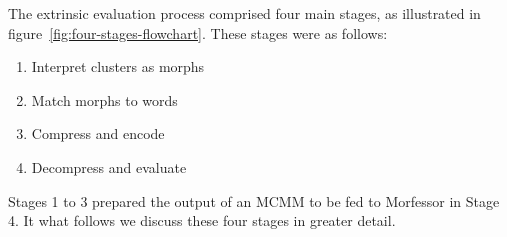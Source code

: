{The extrinsic evaluation process comprised four main stages, as illustrated in figure~\ref{fig:four-stages-flowchart}. These stages were as follows:
\begin{enumerate}
\item Interpret clusters as morphs
\item Match morphs to words
\item Compress and encode
\item Decompress and evaluate
\end{enumerate}
Stages 1 to 3 prepared the output of an MCMM to be fed to Morfessor in Stage 4. 
It what follows we discuss these four stages in
 greater detail. %
}
